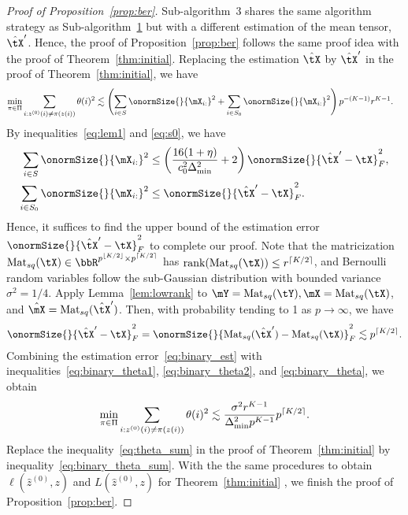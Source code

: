 \documentclass[lettersize,onecolumn,journal]{IEEEtran}
\theoremstyle{definition}
\theoremstyle{definition}
\newcommand{\of}[1]{\left(#1\right)}
\newcommand{\Mat}{\text{Mat}}
\DeclarePairedDelimiter{\ceil}{\lceil}{\rceil}
\DeclarePairedDelimiter{\floor}{\lfloor}{\rfloor}
\begin{document}
{
\color{blue} 

\begin{proof}[Proof of Proposition~\ref{prop:ber}]  Sub-algorithm~3 shares the same algorithm strategy as Sub-algorithm~\hyperref[alg:main]{1} but with a different estimation of the mean tensor, $\hat \tX'$. Hence, the proof of Proposition~\ref{prop:ber} follows the same proof idea with the proof of Theorem~\ref{thm:initial}. Replacing the estimation $\hat \tX$ by $\hat \tX'$ in the proof of Theorem~\ref{thm:initial}, we have 
\begin{align}
        \min_{\pi \in \Pi} \sum_{i : z^{(0)}(i) \neq \pi(z(i))} \theta(i)^2  &\lesssim \of{\sum_{i \in S} \onormSize{}{\mX_{i:}}^2 + \sum_{i \in S_0} \onormSize{}{\mX_{i:}}^2  } p^{-(K-1)} r^{K-1}. \label{eq:binary_theta}
    \end{align}
By inequalities~\eqref{eq:lem1} and \eqref{eq:s0}, we have 
\begin{align}
   \sum_{i \in S} \onormSize{}{\mX_{i:}}^2 &\leq  \of{ \frac{16(1 + \eta)}{c_0^2 \Delta_{\min}^2 } + 2 }\onormSize{}{\hat \tX' - \tX}_F^2, \label{eq:binary_theta1}  \\
   \sum_{i \in S_0} \onormSize{}{\mX_{i:}}^2 &\leq  \onormSize{}{\hat \tX' - \tX}_F^2. \label{eq:binary_theta2}
\end{align}
Hence, it suffices to find the upper bound of the estimation error $\onormSize{}{\hat \tX' - \tX}_F^2$ to complete our proof. Note that the matricization $\Mat_{sq}(\tX) \in \bbR^{p^{\floor{K/2}} \times p^{\ceil{K/2}}}$ has $\text{rank}(\Mat_{sq}(\tX)) \leq r^{\ceil{K/2}}$, and Bernoulli random variables follow the sub-Gaussian distribution with bounded variance $\sigma^2 = 1/4$. Apply Lemma~\ref{lem:lowrank} to $\mY = \Mat_{sq}(\tY), \mX = \Mat_{sq}(\tX)$, and $\hat \mX = \Mat_{sq}(\hat \tX')$. Then, with probability tending to 1 as $ p \rightarrow \infty$, we have 
        \begin{equation}\label{eq:binary_est}
            \onormSize{}{\hat \tX' - \tX}_F^2 = \onormSize{}{\Mat_{sq}(\hat \tX') - \Mat_{sq}(\tX)}_F^2 \lesssim p^{\ceil{K/2}}.
        \end{equation}
Combining the estimation error~\eqref{eq:binary_est} with inequalities~\eqref{eq:binary_theta1}, \eqref{eq:binary_theta2}, and \eqref{eq:binary_theta}, we obtain 
\begin{equation}\label{eq:binary_theta_sum}
    \min_{\pi \in \Pi} \sum_{i : z^{(0)}(i) \neq \pi(z(i))} \theta(i)^2 \lesssim  \frac{\sigma^2 r^{K-1}}{ \Delta_{\min}^2  p^{K-1} } p^{\ceil{K/2}}.
\end{equation}
Replace the inequality~\eqref{eq:theta_sum} in the proof of Theorem~\ref{thm:initial} by inequality~\eqref{eq:binary_theta_sum}. With the the same procedures to obtain $\ell(\hat z^{(0)}, z)$ and $L(\hat z^{(0)}, z)$ for Theorem~\ref{thm:initial} , we finish the proof of Proposition~\ref{prop:ber}.
\end{proof}


}
\end{document}
